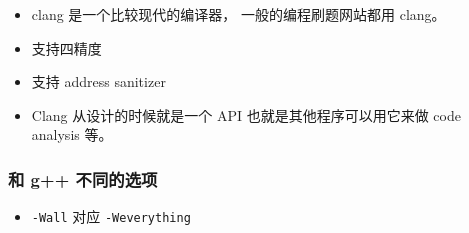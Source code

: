 
\begin{issues}
\issueDraft
\end{issues}

\begin{itemize}
\item clang 是一个比较现代的编译器， 一般的编程刷题网站都用 clang。
\item 支持四精度
\item 支持 address sanitizer
\item Clang 从设计的时候就是一个 API 也就是其他程序可以用它来做 code analysis 等。
\end{itemize}

\subsubsection{和 g++ 不同的选项}
\begin{itemize}
\item \verb|-Wall| 对应 \verb|-Weverything|
\end{itemize}

